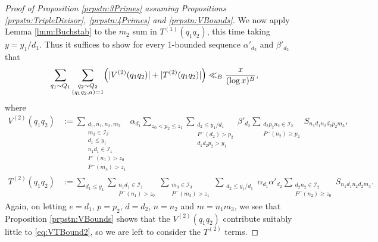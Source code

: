 \documentclass[10pt]{amsart}
\theoremstyle{plain}
\numberwithin{equation}{section}
\begin{document}
\begin{proof}[Proof of Proposition \ref{prpstn:3Primes} assuming Propositions \ref{prpstn:TripleDivisor}, \ref{prpstn:4Primes} and \ref{prpstn:VBounds}]
We now apply Lemma \ref{lmm:Buchstab} to the $m_2$ sum in $T^{(1)}(q_1q_2)$, this time taking $y=y_1/d_1$. Thus it suffices to show for every 1-bounded sequence $\alpha'_{d_2}$ and $\beta'_{d_2}$ that
\begin{equation}
\sum_{q_1\sim Q_1}\sum_{\substack{ q_2\sim Q_2\\ (q_1q_2,a)=1}}\Bigl(|V^{(2)}(q_1q_2)|+|T^{(2)}(q_1q_2)|\Bigr)\ll_B\frac{x}{(\log{x})^B},
\label{eq:VTBound2}
\end{equation}
where
\begin{align*}
V^{(2)}(q_1q_2)&:=\sum_{\substack{d_1,n_1,n_2,m_3\\ m_3\in \mathcal{I}_3\\ d_1\le y_1\\ n_1d_1\in\mathcal{I}_1\\ P^-(n_1)>z_0\\ P^-(m_3)>z_1}}\alpha_{d_1}\sum_{z_0<p_2\le z_1}\sum_{\substack{d_2\le y_1/d_1\\ P^-(d_2)>p_2\\ d_1 d_2 p_2>y_1}}\beta'_{d_2}\sum_{\substack{d_2 p_2 n_2\in \mathcal{I}_2\\ P^-(n_2)\ge p_2}}S_{n_1 d_1 n_2 d_2 p_2 m_3},\\
T^{(2)}(q_1q_2)&:=\sum_{d_1\le y_1}\sum_{\substack{n_1d_1\in\mathcal{I}_1\\ P^-(n_1)>z_0}}\sum_{\substack{m_3\in \mathcal{I}_3\\ P^-(m_3)>z_1}}\sum_{\substack{d_2\le y_1/d_1}}\alpha_{d_1}\alpha'_{d_2}\sum_{\substack{d_2 n_2\in \mathcal{I}_2\\ P^-(n_2)\ge z_0}}S_{n_1 d_1 n_2 d_2 m_3}.
\end{align*}
Again, on letting $e=d_1$, $p=p_2$, $d=d_2$, $n=n_2$ and $m=n_1m_3$, we see that Proposition \ref{prpstn:VBounds} shows that the $V^{(2)}(q_1q_2)$ contribute suitably little to \eqref{eq:VTBound2}, so we are left to consider the $T^{(2)}$ terms.


\end{proof}
\end{document}
